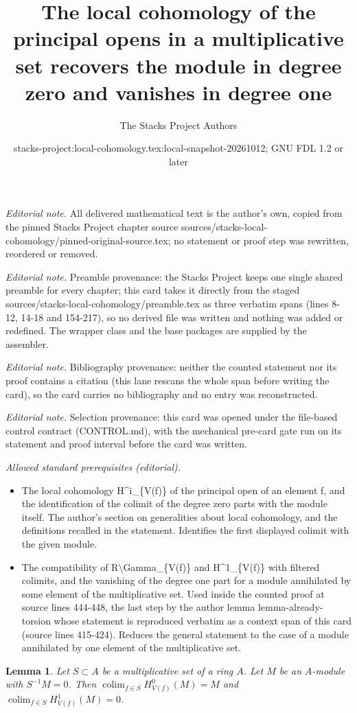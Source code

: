 \documentclass[10pt,a4paper]{amsart}
\title{The local cohomology of the principal opens in a multiplicative set recovers the module in degree zero and vanishes in degree one}
\author{The Stacks Project Authors}
\date{stacks-project:local-cohomology.tex:local-snapshot-20261012; GNU FDL 1.2 or later}
\theoremstyle{plain}
\newtheorem{lemma}[subsection]{Lemma}
\theoremstyle{definition}
\theoremstyle{remark}
\numberwithin{equation}{subsection}
\def\colim{\mathop{\mathrm{colim}}\nolimits}
\begin{document}
\maketitle
\noindent\textit{Editorial note.} All delivered mathematical text is the author's own, copied from the pinned Stacks Project chapter source sources/stacks-local-cohomology/pinned-original-source.tex; no statement or proof step was rewritten, reordered or removed.\par\medskip
\noindent\textit{Editorial note.} Preamble provenance: the Stacks Project keeps one single shared preamble for every chapter; this card takes it directly from the staged sources/stacks-local-cohomology/preamble.tex as three verbatim spans (lines 8-12, 14-18 and 154-217), so no derived file was written and nothing was added or redefined. The wrapper class and the base packages are supplied by the assembler.\par\medskip
\noindent\textit{Editorial note.} Bibliography provenance: neither the counted statement nor its proof contains a citation (this lane rescans the whole span before writing the card), so the card carries no bibliography and no entry was reconstructed.\par\medskip
\noindent\textit{Editorial note.} Selection provenance: this card was opened under the file-based control contract (CONTROL.md), with the mechanical pre-card gate run on its statement and proof interval before the card was written.\par\medskip
\noindent\textit{Allowed standard prerequisites (editorial).}\begin{itemize}
\item The local cohomology H\textasciicircum{}i\_\{V(f)\} of the principal open of an element f, and the identification of the colimit of the degree zero parts with the module itself. The author's section on generalities about local cohomology, and the definitions recalled in the statement. Identifies the first displayed colimit with the given module.
\item The compatibility of R\textbackslash{}Gamma\_\{V(f)\} and H\textasciicircum{}1\_\{V(f)\} with filtered colimits, and the vanishing of the degree one part for a module annihilated by some element of the multiplicative set. Used inside the counted proof at source lines 444-448, the last step by the author lemma lemma-already-torsion whose statement is reproduced verbatim as a context span of this card (source lines 415-424). Reduces the general statement to the case of a module annihilated by one element of the multiplicative set.
\end{itemize}\medskip
\begin{lemma}
\label{lemma-multiplicative}
Let $S \subset A$ be a multiplicative set of a ring $A$.
Let $M$ be an $A$-module with $S^{-1}M = 0$. Then
$\colim_{f \in S} H^0_{V(f)}(M) = M$ and
$\colim_{f \in S} H^1_{V(f)}(M) = 0$.
\end{lemma}
\end{document}
